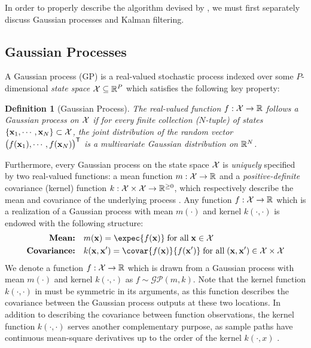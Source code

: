 \documentclass[10pt]{article}
\newtheorem{definition}{Definition}
\newcommand{\calGP}{\mathcal{GP}}
\begin{document}
In order to properly describe the algorithm devised by \citet{Todescato-Efficient-2020}, we must first separately discuss Gaussian processes and Kalman filtering.

\subsection{Gaussian Processes}
\label{subsec:intro-GP}

A Gaussian process (GP) is a real-valued stochastic process indexed over some $P$-dimensional \emph{state space} $\mathcal{X} \subseteq \mathbb{R}^{P}$ which satisfies the following key property:

\begin{definition}[Gaussian Process]
\label{def:GP}
    The real-valued function $f: \mathcal{X} \to \mathbb{R}$ follows a Gaussian process on $\mathcal{X}$ if for every finite collection ($N$-tuple) of states $\{\mathbf{x}_{1}, \cdots, \mathbf{x}_{N}\} \subset \mathcal{X}$, the joint distribution of the random vector $\big(f(\mathbf{x}_{1}), \cdots, f(\mathbf{x}_{N})\big)^{\scriptstyle{\mathsf{T}}}$ is a multivariate Gaussian distribution on $\mathbb{R}^{N}$. 
\end{definition}

Furthermore, every Gaussian process on the state space $\mathcal{X}$ is \emph{uniquely} specified by two real-valued functions: a mean function $m: \mathcal{X} \to \mathbb{R}$ and a \emph{positive-definite} covariance (kernel) function $k: \mathcal{X} \times \mathcal{X} \to \mathbb{R}^{\ge 0}$, which respectively describe the mean and covariance of the underlying process \citep{GPML-Book-2006}. Any function $f: \mathcal{X} \to \mathbb{R}$ which is a realization of a Gaussian process with mean $m(\cdot)$ and kernel $k(\cdot, \cdot)$ is endowed with the following structure:
\begin{subequations}
    \label{eq:GP-prior}
    \begin{align}
        \textbf{Mean:} \quad & m(\bfx) = \expec{f(\bfx)}\; \textrm{for all}\; \bfx \in \calX\label{eq:GP-prior-mean}\\%
        \textbf{Covariance:} \quad & k(\bfx, \bfx') = \covar{f(\bfx)}{f(\bfx')}\; \textrm{for all}\;(\bfx, \bfx') \in \calX \times \calX\label{eq:GP-prior-kernel}
    \end{align}
\end{subequations}
We denote a function $f: \mathcal{X} \to \mathbb{R}$ which is drawn from a Gaussian process with mean $m(\cdot)$ and kernel $k(\cdot, \cdot)$ as $f \sim \calGP(m, k)$. Note that the kernel function $k(\cdot, \cdot)$ in  must be symmetric in its arguments, as this function describes the covariance between the Gaussian process outputs at these two locations. In addition to describing the covariance between function observations, the kernel function $k(\cdot, \cdot)$ serves another complementary purpose, as sample paths have continuous mean-square derivatives up to the order of the kernel $k(\cdot, x)$ \citep{GPML-Book-2006}.
\end{document}
